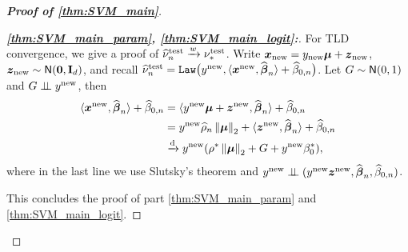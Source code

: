 \begin{proof}[\textbf{Proof of \cref{thm:SVM_main}}]
\begin{proof}[\textbf{\emph{\ref{thm:SVM_main_param}, \ref{thm:SVM_main_logit}:}}]

For TLD convergence, we give a proof of $\widehat\nu_{n}^\mathrm{test} \xrightarrow{w} \nu_*^\mathrm{test}$. Write $\text{\boldmath $x$}_\mathrm{new} = y_\mathrm{new} \text{\boldmath $\mu$} + \text{\boldmath $z$}_\mathrm{new}$, $\text{\boldmath $z$}_\mathrm{new} \sim {\sf N}(\mathrm{\bf 0}, \mathrm{\bf I}_d)$, and recall $\widehat\nu_{n}^\mathrm{test} = \mathtt{Law} \bigl(y^\mathrm{new}, \langle \text{\boldmath $x$}^\mathrm{new}, \widehat{{\boldsymbol{\beta}}}_n \rangle + \widehat\beta_{0,n} \bigr)$. Let $G \sim {\sf N}(0, 1)$ and $G \perp\!\!\!\perp y^\mathrm{new}$, then
\begin{align*}
   \langle \text{\boldmath $x$}^\mathrm{new}, \widehat{{\boldsymbol{\beta}}}_n \rangle + \widehat\beta_{0,n}
    & = \langle y^\mathrm{new}\text{\boldmath $\mu$} + \text{\boldmath $z$}^\mathrm{new}, \widehat{{\boldsymbol{\beta}}}_n \rangle + \widehat\beta_{0,n} \\
    & = y^\mathrm{new} \widehat\rho_n \left\|{\text{\boldmath $\mu$}}\right\|_2 + \langle \text{\boldmath $z$}^\mathrm{new}, \widehat{{\boldsymbol{\beta}}}_n \rangle
    + \widehat\beta_{0,n} \\
    & \xrightarrow{\mathrm{d}} y^\mathrm{new} ( \rho^* \left\|{\text{\boldmath $\mu$}}\right\|_2 + G + y^\mathrm{new} \beta_{0}^*),
\end{align*}
where in the last line we use Slutsky's theorem and $y^\mathrm{new} \perp\!\!\!\perp (y^\mathrm{new}\text{\boldmath $z$}^\mathrm{new}, \widehat{{\boldsymbol{\beta}}}_n, \widehat\beta_{0,n})$.

This concludes the proof of part \ref{thm:SVM_main_param} and \ref{thm:SVM_main_logit}.
\end{proof}


\end{proof}
